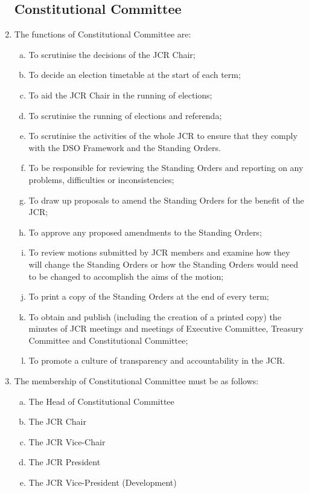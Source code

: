 \documentclass[12pt]{article}  %
\begin{document}
\begin{enumerate}
	\subsection{Constitutional Committee}
	\item The functions of Constitutional Committee are:
	\begin{enumerate}[(a)]
		\item To scrutinise the decisions of the JCR Chair;
		\item To decide an election timetable at the start of each term;
		\item To aid the JCR Chair in the running of elections;
		\item To scrutinise the running of elections and referenda;
		\item To scrutinise the activities of the whole JCR to ensure that they comply with the DSO Framework and the Standing Orders.
		\item To be responsible for reviewing the Standing Orders and reporting on any problems, difficulties or inconsistencies;
		\item To draw up proposals to amend the Standing Orders for the benefit of the JCR;
		\item To approve any proposed amendments to the Standing Orders;
		\item To review motions submitted by JCR members and examine how they will change the Standing Orders or how the Standing Orders would need to be changed to accomplish the aims of the motion;
		\item To print a copy of the Standing Orders at the end of every term;
		\item To obtain and publish (including the creation of a printed copy) the minutes of JCR meetings and meetings of Executive Committee, Treasury Committee and Constitutional Committee;
		\item To promote a culture of transparency and accountability in the JCR.
	\end{enumerate}
	\item The membership of Constitutional Committee must be as follows:
	\begin{enumerate}[(a)]
		\item The Head of Constitutional Committee
		\item The JCR Chair
		\item The JCR Vice-Chair
		\item The JCR President
		\item The JCR Vice-President (Development)

\end{enumerate}
\end{enumerate}
\end{document}
